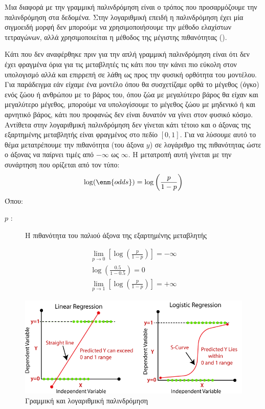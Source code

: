 Μια διαφορά με την
γραμμική παλινδρόμηση είναι ο τρόπος που προσαρμόζουμε την παλινδρόμηση στα
δεδομένα. Στην λογαριθμική επειδή η παλινδρόμηση έχει μία σιγμοειδή μορφή δεν
μπορούμε να χρησιμοποιήσουμε την μέθοδο ελαχίστων τετραγώνων, αλλά χρησιμοποιείται
η μέθοδος της μέγιστης πιθανότητας ().

Κάτι που δεν αναφέρθηκε πριν για την απλή γραμμική παλινδρόμηση είναι ότι δεν έχει
φραγμένα όρια για τις μεταβλητές τις κάτι που την κάνει πιο εύκολη στον υπολογισμό αλλά
και επιρρεπή σε λάθη ως προς την φυσική ορθότητα του μοντέλου. Για παράδειγμα εάν
είχαμε ένα μοντέλο όπου θα συσχετίζαμε ορθά το μέγεθος (όγκο) ενός ζώου ή ανθρώπου με
το βάρος του, όπου ζώα με μεγαλύτερο βάρος θα είχαν και μεγαλύτερο μέγεθος, μπορούμε
να υπολογίσουμε το μέγεθος ζώου με μηδενικό ή και αρνητικό βάρος, κάτι που προφανώς
δεν είναι δυνατόν να γίνει στον φυσικό κόσμο. Αντίθετα στην λογαριθμική παλινδρόμηση δεν
γίνεται κάτι τέτοιο και ο άξονας της εξαρτημένης μεταβλητής είναι φραγμένος στο πεδίο $[0,1]$.
Για να λύσουμε αυτό το θέμα μετατρέπουμε την πιθανότητα (του άξονα $y$) σε λογάριθμο της
πιθανότητας ώστε ο άξονας να παίρνει τιμές από $-\infty$ ως $\infty$. Η μετατροπή αυτή γίνεται με
την συνάρτηση  που ορίζεται από τον τύπο:
$$\log(\enm{odds})=\log\left(\frac{p}{1-p}\right)$$
Όπου:
\begin{description}
    \item[$p$ :] Η πιθανότητα του παλιού άξονα της εξαρτημένης μεταβλητής
\end{description}
\begin{gather*}
    \lim\limits_{p\rightarrow0}\left[\log\left(\frac{p}{1-p}\right)\right]=-\infty \\
    \log\left(\frac{0.5}{1-0.5}\right)=0\\
    \lim\limits_{p\rightarrow1}\left[\log\left(\frac{p}{1-p}\right)\right]=+\infty
\end{gather*}

\begin{figure}[H]
    \centering
    \includegraphics[width=1\textwidth]{images/linear-regression-vs-logistic-regression.png}
    \caption{Γραμμική και λογαριθμική παλινδρόμηση}
\end{figure}

